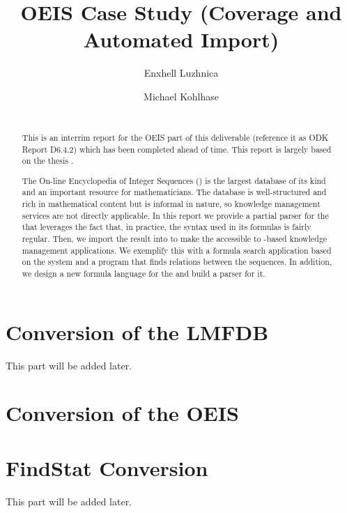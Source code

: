 \documentclass[book]{deliverablereport}
\title{OEIS Case Study (Coverage and Automated Import)}
\author{Enxhell Luzhnica}
\author{Michael Kohlhase}
\begin{document}
\begin{abstract}\strut\\
  {\color{red} This is an interrim report for the OEIS part of this deliverable (reference
    it as ODK Report D6.4.2) which has been completed ahead of time. This report is
    largely based on the thesis \cite{Luzhnica:bsc16}.}

  \begin{sffamily}
  The On-line Encyclopedia of Integer Sequences (\oeis) is the largest database of its
  kind and an important resource for mathematicians. The database is well-structured and
  rich in mathematical content but is informal in nature, so knowledge management services
  are not directly applicable.  In this report we provide a partial parser for the \oeis
  that leverages the fact that, in practice, the syntax used in its formulas is fairly
  regular. Then, we import the result into \omdoc to make the \oeis accessible to
  \omdoc-based knowledge management applications. We exemplify this with a formula search
  application based on the \mws system and a program that finds relations between the
  \oeis sequences.  In addition, we design a new formula language for the \oeis and build
  a parser for it.
  \end{sffamily}
\end{abstract}
\maketitle

\newpage
\tableofcontents
\newpage
\chapter{Conversion of the LMFDB}
This part will be added later. 

\chapter{Conversion of the OEIS}









\chapter{FindStat Conversion}
This part will be added later. 

\newpage\printbibliography
\cleardoublepage


\nocite{IanKoh:mlkmim15}
\nocite{RabKoh:WSMSML13}
\nocite{Rabe:MAGMS13}
\nocite{oeis}
\nocite{DBLP:conf/lwa/LuzhnicaIK15}
\nocite{DBLP:conf/icms/LuzhnicaK16}
\end{document}
